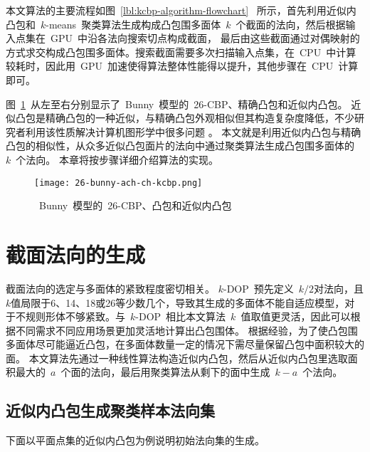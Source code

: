 本文算法的主要流程如图~\ref{lbl:kcbp-algorithm-flowchart}~
所示，首先利用近似内凸包和~$k$-means~聚类算法生成构成凸包围多面体~$k$~个截面的法向，然后根据输入点集在~GPU~中沿各法向搜索切点构成截面，
最后由这些截面通过对偶映射的方式求交构成凸包围多面体。搜索截面需要多次扫描输入点集，在~CPU~中计算较耗时，因此用~GPU~加速使得算法整体性能得以提升，其他步骤在~CPU~计算即可。

图~\ref{lbl:bunny-26-cbp-ch-ach}~从左至右分别显示了~Bunny~模型的~26-CBP、精确凸包和近似内凸包。
近似凸包是精确凸包的一种近似，与精确凸包外观相似但其构造复杂度降低，不少研究者利用该性质解决计算机图形学中很多问题
\cite{hossain2013constructing}。
本文就是利用近似内凸包与精确凸包的相似性，从众多近似凸包面片的法向中通过聚类算法生成凸包围多面体的~$k$~个法向。
本章将按步骤详细介绍算法的实现。

\begin{figure}[htbp] %
\centering
\texttt{[image: 26-bunny-ach-ch-kcbp.png]}
\caption{~Bunny~模型的~26-CBP、凸包和近似内凸包}
\label{lbl:bunny-26-cbp-ch-ach}
\end{figure}

\section{截面法向的生成}
\label{sec:gen-normals}

截面法向的选定与多面体的紧致程度密切相关。
$k$-DOP~预先定义~$k/2$对法向，且$k$值局限于6、14、18或26等少数几个，导致其生成的多面体不能自适应模型，对于不规则形体不够紧致。与~$k$-DOP~相比本文算法~$k$~值取值更灵活，因此可以根据不同需求不同应用场景更加灵活地计算出凸包围体。
根据经验，为了使凸包围多面体尽可能逼近凸包，在多面体数量一定的情况下需尽量保留凸包中面积较大的面。 
本文算法先通过一种线性算法\cite{bentley1982approximation}构造近似内凸包，然后从近似内凸包里选取面积最大的~$a$~个面的法向，最后用聚类算法从剩下的面中生成~$k-a$~个法向。

\subsection{近似内凸包生成聚类样本法向集}
\label{subsec:ach-gen-normals}

下面以平面点集的近似内凸包为例说明初始法向集的生成。

